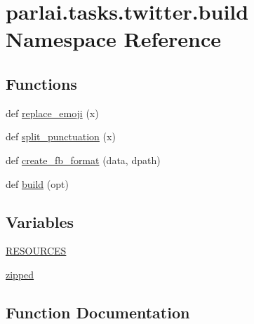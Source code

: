 \hypertarget{namespaceparlai_1_1tasks_1_1twitter_1_1build}{}\section{parlai.\+tasks.\+twitter.\+build Namespace Reference}
\label{namespaceparlai_1_1tasks_1_1twitter_1_1build}
\subsection*{Functions}
\begin{DoxyCompactItemize}
\item 
def \hyperlink{namespaceparlai_1_1tasks_1_1twitter_1_1build_aea2acf2542f3fb1294fa121bb7cb1a76}{replace\+\_\+emoji} (x)
\item 
def \hyperlink{namespaceparlai_1_1tasks_1_1twitter_1_1build_a6296215f669301c1e46b7588e1291ae7}{split\+\_\+punctuation} (x)
\item 
def \hyperlink{namespaceparlai_1_1tasks_1_1twitter_1_1build_ab36b25b09bea28cdf3278f910e5e9ff6}{create\+\_\+fb\+\_\+format} (data, dpath)
\item 
def \hyperlink{namespaceparlai_1_1tasks_1_1twitter_1_1build_a8faa6a4ae6f2adaa22f068cc6781898d}{build} (opt)
\end{DoxyCompactItemize}
\subsection*{Variables}
\begin{DoxyCompactItemize}
\item 
\hyperlink{namespaceparlai_1_1tasks_1_1twitter_1_1build_abba1eb3a3cdb532a871ad3e5038c065b}{R\+E\+S\+O\+U\+R\+C\+ES}
\item 
\hyperlink{namespaceparlai_1_1tasks_1_1twitter_1_1build_a6447bc40ce23eba2339cc128d5f0e8fa}{zipped}
\end{DoxyCompactItemize}


\subsection{Function Documentation}
\mbox{\label{namespaceparlai_1_1tasks_1_1twitter_1_1build_a8faa6a4ae6f2adaa22f068cc6781898d}} 
